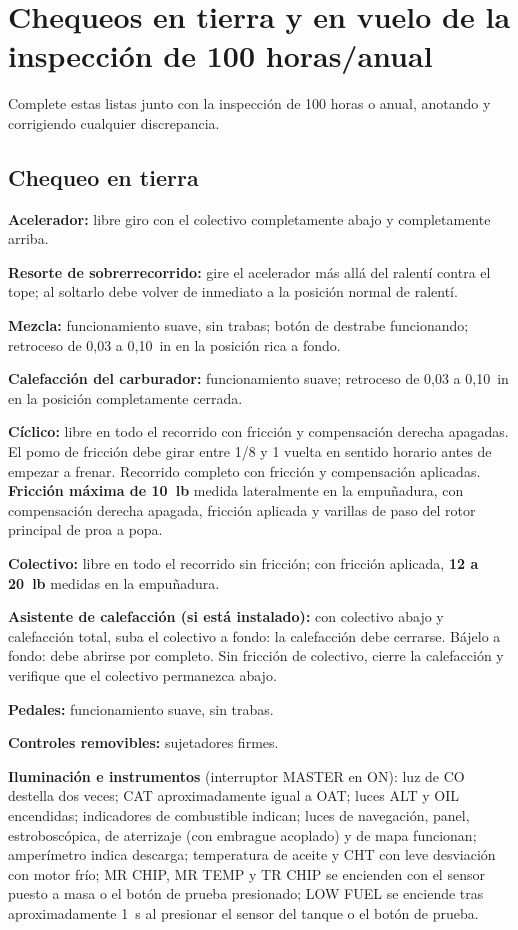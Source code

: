\section{Chequeos en tierra y en vuelo de la inspección de 100 horas/anual}

Complete estas listas junto con la inspección de 100 horas o anual, anotando y corrigiendo cualquier discrepancia.

\subsection{Chequeo en tierra}

\begin{pasos}
\item \textbf{Acelerador:} libre giro con el colectivo completamente abajo y completamente arriba.
\item \textbf{Resorte de sobrerrecorrido:} gire el acelerador más allá del ralentí contra el tope; al soltarlo debe volver de inmediato a la posición normal de ralentí.
\item \textbf{Mezcla:} funcionamiento suave, sin trabas; botón de destrabe funcionando; retroceso de 0,03 a 0,10~in en la posición rica a fondo.
\item \textbf{Calefacción del carburador:} funcionamiento suave; retroceso de 0,03 a 0,10~in en la posición completamente cerrada.
\item \textbf{Cíclico:} libre en todo el recorrido con fricción y compensación derecha apagadas. El pomo de fricción debe girar entre 1/8 y 1 vuelta en sentido horario antes de empezar a frenar. Recorrido completo con fricción y compensación aplicadas. \textbf{Fricción máxima de 10~lb} medida lateralmente en la empuñadura, con compensación derecha apagada, fricción aplicada y varillas de paso del rotor principal de proa a popa.
\item \textbf{Colectivo:} libre en todo el recorrido sin fricción; con fricción aplicada, \textbf{12 a 20~lb} medidas en la empuñadura.
\item \textbf{Asistente de calefacción (si está instalado):} con colectivo abajo y calefacción total, suba el colectivo a fondo: la calefacción debe cerrarse. Bájelo a fondo: debe abrirse por completo. Sin fricción de colectivo, cierre la calefacción y verifique que el colectivo permanezca abajo.
\item \textbf{Pedales:} funcionamiento suave, sin trabas.
\item \textbf{Controles removibles:} sujetadores firmes.
\item \textbf{Iluminación e instrumentos} (interruptor \textsf{MASTER} en ON): luz de CO destella dos veces; CAT aproximadamente igual a OAT; luces \textsf{ALT} y \textsf{OIL} encendidas; indicadores de combustible indican; luces de navegación, panel, estroboscópica, de aterrizaje (con embrague acoplado) y de mapa funcionan; amperímetro indica descarga; temperatura de aceite y CHT con leve desviación con motor frío; \textsf{MR CHIP}, \textsf{MR TEMP} y \textsf{TR CHIP} se encienden con el sensor puesto a masa o el botón de prueba presionado; \textsf{LOW FUEL} se enciende tras aproximadamente 1~s al presionar el sensor del tanque o el botón de prueba.
\end{pasos}

